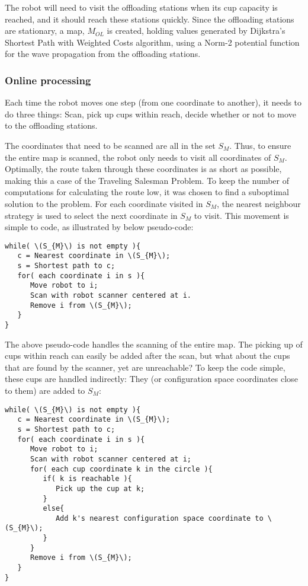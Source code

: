 The robot will need to visit the offloading stations when its cup capacity is reached, and it should
reach these stations quickly. Since the offloading stations are stationary, a map, \(M_{OL}\) is created,
holding values generated by Dijkstra's Shortest Path with Weighted Costs algorithm, using a Norm-2 potential function
for the wave propagation from the offloading stations.

\subsubsection{Online processing}

Each time the robot moves one step (from one coordinate to another),
it needs to do three things: Scan, pick up cups within reach, decide whether or not to move to the offloading stations.

The coordinates that need to be scanned are all in the set \(S_{M}\).
Thus, to ensure the entire map is scanned, the robot only needs to visit all coordinates of  \(S_{M}\).
Optimally, the route taken through these coordinates is as short as possible,
making this a case of the Traveling Salesman Problem.
To keep the number of computations for calculating the route low, it was chosen to find a suboptimal solution to the problem.
For each coordinate visited in \(S_{M}\), the nearest neighbour strategy is used to select the next coordinate in \(S_{M}\) to visit.
This movement is simple to code, as illustrated by below pseudo-code:

\begin{verbatim}
while( \(S_{M}\) is not empty ){
   c = Nearest coordinate in \(S_{M}\);
   s = Shortest path to c;
   for( each coordinate i in s ){
      Move robot to i;
      Scan with robot scanner centered at i.
      Remove i from \(S_{M}\);
   }
}
\end{verbatim}

The above pseudo-code handles the scanning of the entire map.
The picking up of cups within reach can easily be added after the scan,
but what about the cups that are found by the scanner, yet are unreachable?
To keep the code simple, these cups are handled indirectly: They (or configuration space coordinates close to them) are added to \(S_{M}\):

\begin{verbatim}
while( \(S_{M}\) is not empty ){
   c = Nearest coordinate in \(S_{M}\);
   s = Shortest path to c;
   for( each coordinate i in s ){
      Move robot to i;
      Scan with robot scanner centered at i;
      for( each cup coordinate k in the circle ){
         if( k is reachable ){
            Pick up the cup at k;
         }
         else{
            Add k's nearest configuration space coordinate to \(S_{M}\);
         }
      }
      Remove i from \(S_{M}\);
   }
}
\end{verbatim}

